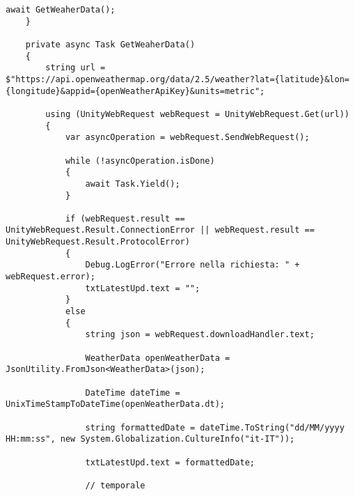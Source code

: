 \begin{lstlisting}[caption=Codice sorgente dello script \textit{OpenWeatherAPICaller}, label=lst:OpenWeatherAPICallerScript, captionpos=b, basicstyle=\scriptsize]
        await GetWeaherData();
    }
    
    private async Task GetWeaherData()
    {
        string url = $"https://api.openweathermap.org/data/2.5/weather?lat={latitude}&lon={longitude}&appid={openWeatherApiKey}&units=metric";

        using (UnityWebRequest webRequest = UnityWebRequest.Get(url))
        {
            var asyncOperation = webRequest.SendWebRequest();
            
            while (!asyncOperation.isDone)
            {
                await Task.Yield();
            }

            if (webRequest.result == UnityWebRequest.Result.ConnectionError || webRequest.result == UnityWebRequest.Result.ProtocolError)
            {
                Debug.LogError("Errore nella richiesta: " + webRequest.error);
                txtLatestUpd.text = "";
            }
            else
            {
                string json = webRequest.downloadHandler.text;
               
                WeatherData openWeatherData = JsonUtility.FromJson<WeatherData>(json);

                DateTime dateTime = UnixTimeStampToDateTime(openWeatherData.dt);
                
                string formattedDate = dateTime.ToString("dd/MM/yyyy HH:mm:ss", new System.Globalization.CultureInfo("it-IT"));

                txtLatestUpd.text = formattedDate;
                
                // temporale
                

\end{lstlisting}
